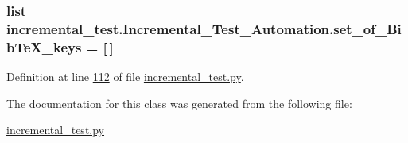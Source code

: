 \subsubsection[{set\+\_\+of\+\_\+\+Bib\+Te\+X\+\_\+keys}]{\setlength{\rightskip}{0pt plus 5cm}list incremental\+\_\+test.\+Incremental\+\_\+\+Test\+\_\+\+Automation.\+set\+\_\+of\+\_\+\+Bib\+Te\+X\+\_\+keys = \mbox{[}$\,$\mbox{]}\hspace{0.3cm}{\ttfamily [static]}}\label{classincremental__test_1_1Incremental__Test__Automation_a8f5272e0488026aa24a829262392f2f7}


Definition at line \hyperlink{incremental__test_8py_source_l00112}{112} of file \hyperlink{incremental__test_8py_source}{incremental\+\_\+test.\+py}.



The documentation for this class was generated from the following file\+:\begin{DoxyCompactItemize}
\item 
\hyperlink{incremental__test_8py}{incremental\+\_\+test.\+py}\end{DoxyCompactItemize}
